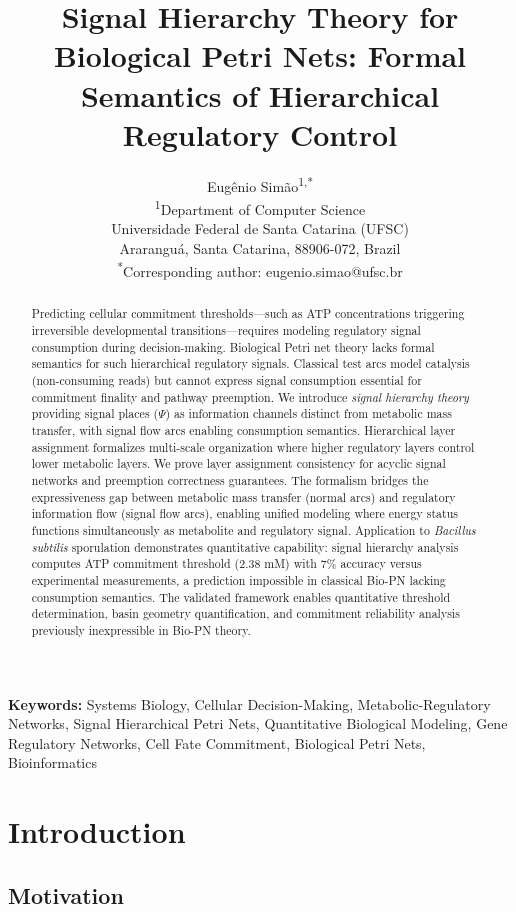 \documentclass[twocolumn,11pt]{article}
\title{\textbf{Signal Hierarchy Theory for Biological Petri Nets: Formal Semantics of Hierarchical Regulatory Control}}
\author{
Eugênio Simão\textsuperscript{1,*}\\
\textsuperscript{1}Department of Computer Science\\
Universidade Federal de Santa Catarina (UFSC)\\
Araranguá, Santa Catarina, 88906-072, Brazil\\
\textsuperscript{*}Corresponding author: eugenio.simao@ufsc.br
}
\date{}
\begin{document}
\maketitle

\begin{abstract}
Predicting cellular commitment thresholds---such as ATP concentrations triggering irreversible developmental transitions---requires modeling regulatory signal consumption during decision-making. Biological Petri net theory lacks formal semantics for such hierarchical regulatory signals. Classical test arcs model catalysis (non-consuming reads) but cannot express signal consumption essential for commitment finality and pathway preemption. We introduce \textit{signal hierarchy theory} providing signal places ($\Psi$) as information channels distinct from metabolic mass transfer, with signal flow arcs enabling consumption semantics. Hierarchical layer assignment formalizes multi-scale organization where higher regulatory layers control lower metabolic layers. We prove layer assignment consistency for acyclic signal networks and preemption correctness guarantees. The formalism bridges the expressiveness gap between metabolic mass transfer (normal arcs) and regulatory information flow (signal flow arcs), enabling unified modeling where energy status functions simultaneously as metabolite and regulatory signal. Application to \textit{Bacillus subtilis} sporulation demonstrates quantitative capability: signal hierarchy analysis computes ATP commitment threshold (2.38 mM) with 7\% accuracy versus experimental measurements, a prediction impossible in classical Bio-PN lacking consumption semantics. The validated framework enables quantitative threshold determination, basin geometry quantification, and commitment reliability analysis previously inexpressible in Bio-PN theory.
\end{abstract}

\vspace{6pt}
\noindent\textbf{Keywords:} Systems Biology, Cellular Decision-Making, Metabolic-Regulatory Networks, Signal Hierarchical Petri Nets, Quantitative Biological Modeling, Gene Regulatory Networks, Cell Fate Commitment, Biological Petri Nets, Bioinformatics

\section{Introduction}

\subsection{Motivation}
\end{document}
